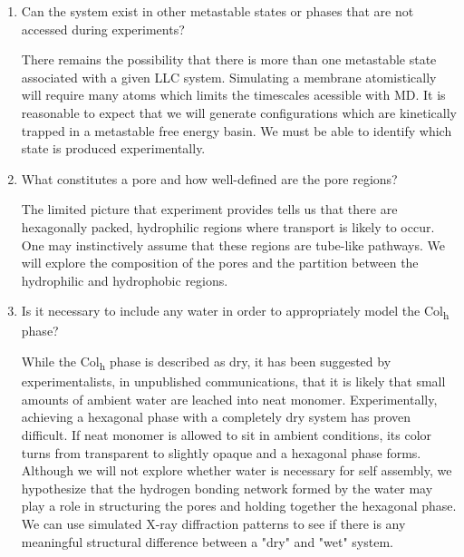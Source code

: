 \documentclass{article}
\begin{document}
\begin{enumerate}
  \item Can the system exist in other metastable states or phases that are not
  accessed during experiments? \label{point:metastable}
  
  There remains the possibility that there is more than one metastable state
  associated with a given LLC system. Simulating a membrane atomistically will
  require many atoms which limits the timescales acessible with MD. It is
  reasonable to expect that we will generate configurations which are kinetically
  trapped in a metastable free energy basin. We must be able to identify which
  state is produced experimentally.

  \item What constitutes a pore and how well-defined are the pore regions? \label{point:poredefinition}

  The limited picture that experiment provides tells us that there are
  hexagonally packed, hydrophilic regions where transport is likely to occur.
  One may instinctively assume that these regions are tube-like pathways. We will
  explore the composition of the pores and the partition between the
  hydrophilic and hydrophobic regions. 

  \item Is it necessary to include any water in order to appropriately model
  the Col\textsubscript{h} phase? \label{point:water}

  While the Col\textsubscript{h} phase is described as dry, it has been
  suggested by experimentalists, in unpublished communications, that it is likely
  that small amounts of ambient water are leached into neat monomer.
  Experimentally, achieving a hexagonal phase with a completely dry system has
  proven difficult. If neat monomer is allowed to sit in ambient conditions, its
  color turns from transparent to slightly opaque and a hexagonal phase forms.
  Although we will not explore whether water is necessary for self assembly, we
  hypothesize that the hydrogen bonding network formed by the water may play a
  role in structuring the pores and holding together the hexagonal phase. We can
  use simulated X-ray diffraction patterns to see if there is any meaningful
  structural difference between a "dry" and "wet" system.

  \end{enumerate}
  
 
\end{document}
